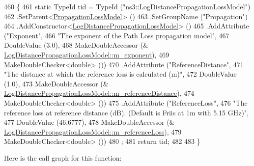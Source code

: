 \begin{DoxyCode}
460 \{
461   \textcolor{keyword}{static} TypeId tid = TypeId (\textcolor{stringliteral}{"ns3::LogDistancePropagationLossModel"})
462     .SetParent<\hyperlink{classns3_1_1PropagationLossModel_ace8b78c2c8e805cd0a919d7e3543318c}{PropagationLossModel}> ()
463     .SetGroupName (\textcolor{stringliteral}{"Propagation"})
464     .AddConstructor<\hyperlink{classns3_1_1LogDistancePropagationLossModel_a59b678e1444813c27be674f6ede5a2dc}{LogDistancePropagationLossModel}> ()
465     .AddAttribute (\textcolor{stringliteral}{"Exponent"},
466                    \textcolor{stringliteral}{"The exponent of the Path Loss propagation model"},
467                    DoubleValue (3.0),
468                    MakeDoubleAccessor (&
      \hyperlink{classns3_1_1LogDistancePropagationLossModel_a70538e0d462564ad358ead5ab67aa3db}{LogDistancePropagationLossModel::m\_exponent}),
469                    MakeDoubleChecker<double> ())
470     .AddAttribute (\textcolor{stringliteral}{"ReferenceDistance"},
471                    \textcolor{stringliteral}{"The distance at which the reference loss is calculated (m)"},
472                    DoubleValue (1.0),
473                    MakeDoubleAccessor (&
      \hyperlink{classns3_1_1LogDistancePropagationLossModel_a1e40651f77e1aa2226eac1668b5bc22c}{LogDistancePropagationLossModel::m\_referenceDistance}),
474                    MakeDoubleChecker<double> ())
475     .AddAttribute (\textcolor{stringliteral}{"ReferenceLoss"},
476                    \textcolor{stringliteral}{"The reference loss at reference distance (dB). (Default is Friis at 1m with 5.15 GHz)"},
477                    DoubleValue (46.6777),
478                    MakeDoubleAccessor (&
      \hyperlink{classns3_1_1LogDistancePropagationLossModel_ad5065bb57e5dc5863189ab6e014080a0}{LogDistancePropagationLossModel::m\_referenceLoss}),
479                    MakeDoubleChecker<double> ())
480   ;
481   \textcolor{keywordflow}{return} tid;
482 
483 \}
\end{DoxyCode}


Here is the call graph for this function\+:


